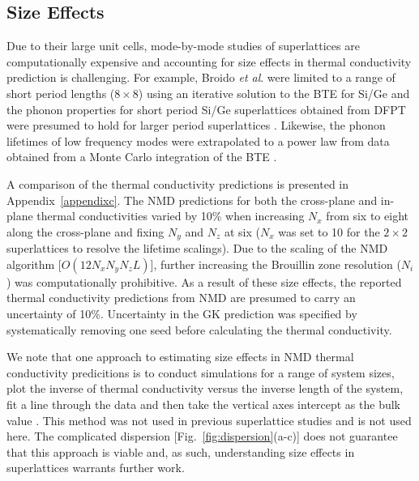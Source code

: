 \subsection{Size Effects}
Due to their large unit cells, mode-by-mode studies of superlattices are computationally expensive and accounting for size effects in thermal conductivity prediction is challenging. For example, Broido \textit{et al}. were limited to a range of short period lengths ($8\times 8$) using an iterative solution to the BTE for Si/Ge \cite {PhysRevB.70.081310} and the phonon properties for short period Si/Ge superlattices obtained from DFPT were presumed to hold for larger period superlattices \cite{Luckyanova16112012, doi:10.1021/nl202186y}. Likewise, the phonon lifetimes of low frequency modes were extrapolated to a power law from data obtained from a Monte Carlo integration of the BTE \cite{savic:073113}. 

A comparison of the thermal conductivity predictions is presented in Appendix~\ref{appendixc}. The NMD predictions for both the cross-plane and in-plane thermal conductivities varied by 10\% when increasing $N_x$ from six to eight along the cross-plane and fixing $N_y$ and $N_z$ at six ($N_x$ was set to 10 for the $2\times2$ superlattices to resolve the lifetime scalings). %
Due to the scaling of the NMD algorithm [$O(12N_xN_yN_z L)$], further increasing the Brouillin zone resolution ($N_i$) was computationally prohibitive. As a result of these size effects, the reported thermal conductivity predictions from NMD are presumed to carry an uncertainty of 10\%. Uncertainty in the GK prediction was specified by systematically removing one seed before calculating the thermal conductivity.

We note that one approach to estimating size effects in NMD thermal conductivity predicitions is to conduct simulations for a range of system sizes, plot the inverse of thermal conductivity versus the inverse length of the system, fit a line through the data and then take the vertical axes intercept as the bulk value \cite{PhysRevB.81.214305}.%
This method was not used in previous superlattice studies \cite{doi:10.1021/nl202186y,savic:073113,Luckyanova16112012} and is not used here. The complicated dispersion [Fig.~\ref{fig:dispersion}(a-c)] does not guarantee that this approach is viable and, as such, understanding size effects in superlattices warrants further work.

